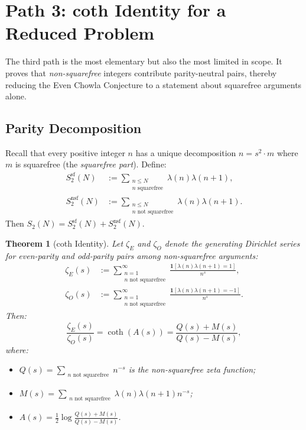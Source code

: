 \documentclass[11pt,a4paper]{article}
\theoremstyle{plain}
\newtheorem{theorem}{Theorem}[section]
\theoremstyle{definition}
\begin{document}
\section{Path 3: coth Identity for a Reduced Problem}
\label{sec:path3}

The third path is the most elementary but also the most limited in scope. It proves that \emph{non-squarefree} integers contribute parity-neutral pairs, thereby reducing the Even Chowla Conjecture to a statement about squarefree arguments alone.

\subsection{Parity Decomposition}

Recall that every positive integer $n$ has a unique decomposition $n = s^2 \cdot m$ where $m$ is squarefree (the \emph{squarefree part}). Define:
\begin{align}
S_2^{\mathrm{sf}}(N) &:= \sum_{\substack{n \leq N \\ n \text{ squarefree}}} \lambda(n)\lambda(n+1), \label{eq:sf-sum} \\
S_2^{\mathrm{nsf}}(N) &:= \sum_{\substack{n \leq N \\ n \text{ not squarefree}}} \lambda(n)\lambda(n+1). \label{eq:nsf-sum}
\end{align}
Then $S_2(N) = S_2^{\mathrm{sf}}(N) + S_2^{\mathrm{nsf}}(N)$.

\begin{theorem}[coth Identity]
\label{thm:coth}
Let $\zeta_E$ and $\zeta_O$ denote the generating Dirichlet series for even-parity and odd-parity pairs among non-squarefree arguments:
\begin{align}
\zeta_E(s) &:= \sum_{\substack{n=1 \\ n \text{ not squarefree}}}^\infty \frac{\mathbf{1}[\lambda(n)\lambda(n+1) = 1]}{n^s}, \label{eq:zeta-E} \\
\zeta_O(s) &:= \sum_{\substack{n=1 \\ n \text{ not squarefree}}}^\infty \frac{\mathbf{1}[\lambda(n)\lambda(n+1) = -1]}{n^s}. \label{eq:zeta-O}
\end{align}
Then:
\begin{equation}
\label{eq:coth}
\frac{\zeta_E(s)}{\zeta_O(s)} = \coth(A(s)) = \frac{Q(s) + M(s)}{Q(s) - M(s)},
\end{equation}
where:
\begin{itemize}
\item $Q(s) = \sum_{\substack{n \text{ not squarefree}}} n^{-s}$ is the non-squarefree zeta function;
\item $M(s) = \sum_{\substack{n \text{ not squarefree}}} \lambda(n)\lambda(n+1) n^{-s}$;
\item $A(s) = \frac{1}{2} \log \frac{Q(s) + M(s)}{Q(s) - M(s)}$.
\end{itemize}
\end{theorem}
\end{document}
